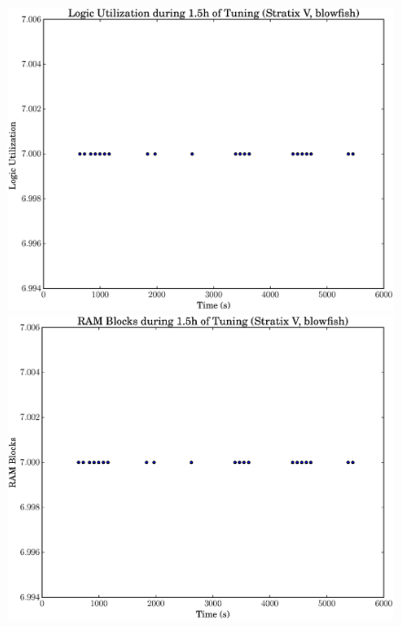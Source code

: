 \documentclass[12pt, a4paper]{article}
\begin{document}
\begin{figure}[htpb]
    \centering
    \noindent
    \begin{minipage}{.48\textwidth}
        \centering
        \includegraphics[scale=.25]{blowfish_lu_5400_chstone_StratixV}
    \end{minipage}%
    \hfill
    \begin{minipage}{.48\textwidth}
        \centering
        \includegraphics[scale=.25]{blowfish_ram_5400_chstone_StratixV}
    \end{minipage}%


\end{figure}
\end{document}
